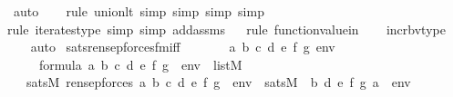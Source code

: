 \begin{isabellebody}
\ auto{\isacharbrackleft}{\kern0pt}{}{\isacharbrackright}{\kern0pt}\isanewline
\ \ \ \isamarkupfalse%
{\isacharparenleft}{\kern0pt}rule\ union{\isacharunderscore}{\kern0pt}lt{}{\isacharcomma}{\kern0pt}\ simp{\isacharcomma}{\kern0pt}\ simp{\isacharcomma}{\kern0pt}\ simp{\isacharcomma}{\kern0pt}\ simp{\isacharparenright}{\kern0pt}\isanewline
\ \ \isamarkupfalse%
{\isacharparenleft}{\kern0pt}rule\ iterates{\isacharunderscore}{\kern0pt}type{\isacharcomma}{\kern0pt}\ simp{\isacharcomma}{\kern0pt}\ simp\ add{\isacharcolon}{\kern0pt}assms{\isacharparenright}{\kern0pt}\isanewline
\ \ \isamarkupfalse%
{\isacharparenleft}{\kern0pt}rule\ function{\isacharunderscore}{\kern0pt}value{\isacharunderscore}{\kern0pt}in{\isacharparenright}{\kern0pt}\isanewline
\ \ \isamarkupfalse%
\ incr{\isacharunderscore}{\kern0pt}bv{\isacharunderscore}{\kern0pt}type\ \isanewline
\ \ \isamarkupfalse%
\ auto%
\endisatagproof
{\isafoldproof}%
%
\isadelimproof
\isanewline
%
\endisadelimproof
\isanewline
{}\isamarkupfalse%
\ sats{\isacharunderscore}{\kern0pt}ren{\isacharunderscore}{\kern0pt}sep{\isacharunderscore}{\kern0pt}forces{\isacharunderscore}{\kern0pt}fm{\isacharunderscore}{\kern0pt}iff\ \ {\isacharcolon}{\kern0pt}\ \isanewline
\ \ \ {\isasymphi}\ a\ b\ c\ d\ e\ f\ g\ env\ \isanewline
\ \ \ {\isachardoublequoteopen}{\isasymphi}\ {\isasymin}\ formula{\isachardoublequoteclose}\ {\isachardoublequoteopen}{\isacharbrackleft}{\kern0pt}a{\isacharcomma}{\kern0pt}\ b{\isacharcomma}{\kern0pt}\ c{\isacharcomma}{\kern0pt}\ d{\isacharcomma}{\kern0pt}\ e{\isacharcomma}{\kern0pt}\ f{\isacharcomma}{\kern0pt}\ g{\isacharbrackright}{\kern0pt}\ {\isacharat}{\kern0pt}\ env\ {\isasymin}\ list{\isacharparenleft}{\kern0pt}M{\isacharparenright}{\kern0pt}{\isachardoublequoteclose}\ \isanewline
\ \ \ {\isachardoublequoteopen}sats{\isacharparenleft}{\kern0pt}M{\isacharcomma}{\kern0pt}\ ren{\isacharunderscore}{\kern0pt}sep{\isacharunderscore}{\kern0pt}forces{\isacharparenleft}{\kern0pt}{\isasymphi}{\isacharparenright}{\kern0pt}{\isacharcomma}{\kern0pt}\ {\isacharbrackleft}{\kern0pt}a{\isacharcomma}{\kern0pt}\ b{\isacharcomma}{\kern0pt}\ c{\isacharcomma}{\kern0pt}\ d{\isacharcomma}{\kern0pt}\ e{\isacharcomma}{\kern0pt}\ f{\isacharcomma}{\kern0pt}\ g{\isacharbrackright}{\kern0pt}\ {\isacharat}{\kern0pt}\ env{\isacharparenright}{\kern0pt}\ {\isasymlongleftrightarrow}\ sats{\isacharparenleft}{\kern0pt}M{\isacharcomma}{\kern0pt}\ {\isasymphi}{\isacharcomma}{\kern0pt}\ {\isacharbrackleft}{\kern0pt}b{\isacharcomma}{\kern0pt}\ d{\isacharcomma}{\kern0pt}\ e{\isacharcomma}{\kern0pt}\ f{\isacharcomma}{\kern0pt}\ g{\isacharcomma}{\kern0pt}\ a{\isacharbrackright}{\kern0pt}\ {\isacharat}{\kern0pt}\ env{\isacharparenright}{\kern0pt}{\isachardoublequoteclose}\ \isanewline

\end{isabellebody}
